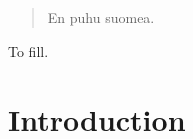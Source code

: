 \documentclass[dissertation,math,vertlayout,pdfa,colorlinks]{aaltoseries}
\begin{document}
 
\begin{abstract}%
En puhu suomea.
\end{abstract}




\begin{preface}[Espoo]
To fill.

\end{preface}

\clearpage
\tableofcontents


\listofpublications






\chapter{Introduction}
\end{document}
